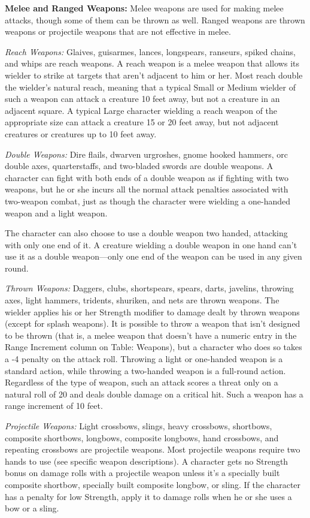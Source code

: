 \documentclass{article}
\begin{document}
\textbf{Melee and Ranged Weapons:} Melee weapons are used for making melee attacks, 
though some of them can be thrown as well. Ranged weapons are thrown weapons or 
projectile weapons that are not effective in melee.

\textit{Reach Weapons: }Glaives, guisarmes, lances, longspears, ranseurs, spiked 
chains, and whips are reach weapons. A reach weapon is a melee weapon that allows 
its wielder to strike at targets that aren't adjacent to him or her. Most reach 
double the wielder's natural reach, meaning that a typical Small or Medium wielder 
of such a weapon can attack a creature 10 feet away, but not a creature in an adjacent 
square. A typical Large character wielding a reach weapon of the appropriate size 
can attack a creature 15 or 20 feet away, but not adjacent creatures or creatures 
up to 10 feet away.

\textit{Double Weapons: }Dire flails, dwarven urgroshes, gnome hooked hammers, 
orc double axes, quarterstaffs, and two-bladed swords are double weapons. A character 
can fight with both ends of a double weapon as if fighting with two weapons, but 
he or she incurs all the normal attack penalties associated with two-weapon combat, 
just as though the character were wielding a one-handed weapon and a light weapon.

The character can also choose to use a double weapon two handed, attacking with 
only one end of it. A creature wielding a double weapon in one hand can't use it 
as a double weapon---only one end of the weapon can be used in any given round.

\textit{Thrown Weapons: }Daggers, clubs, shortspears, spears, darts, javelins, 
throwing axes, light hammers, tridents, shuriken, and nets are thrown weapons. 
The wielder applies his or her Strength modifier to damage dealt by thrown weapons 
(except for splash weapons). It is possible to throw a weapon that isn't designed 
to be thrown (that is, a melee weapon that doesn't have a numeric entry in the 
Range Increment column on Table: Weapons), but a character who does so takes a 
-4 penalty on the attack roll. Throwing a light or one-handed weapon is a standard 
action, while throwing a two-handed weapon is a full-round action. Regardless of 
the type of weapon, such an attack scores a threat only on a natural roll of 20 
and deals double damage on a critical hit. Such a weapon has a range increment 
of 10 feet.

\textit{Projectile Weapons: }Light crossbows, slings, heavy crossbows, shortbows, 
composite shortbows, longbows, composite longbows, hand crossbows, and repeating 
crossbows are projectile weapons. Most projectile weapons require two hands to 
use (see specific weapon descriptions). A character gets no Strength bonus on damage 
rolls with a projectile weapon unless it's a specially built composite shortbow, 
specially built composite longbow, or sling. If the character has a penalty for 
low Strength, apply it to damage rolls when he or she uses a bow or a sling.
\end{document}
